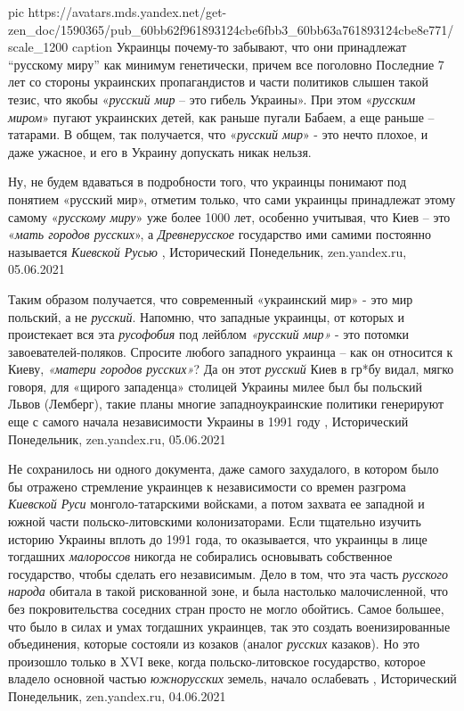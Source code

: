 \ifcmt
	pic https://avatars.mds.yandex.net/get-zen_doc/1590365/pub_60bb62f961893124cbe6fbb3_60bb63a761893124cbe8e771/scale_1200
  caption Украинцы почему-то забывают, что они принадлежат \enquote{русскому миру} как минимум генетически, причем все поголовно
\fi
Последние 7 лет со стороны украинских пропагандистов и части политиков слышен
такой тезис, что якобы «\emph{русский мир} – это гибель Украины». При этом
«\emph{русским миром}» пугают украинских детей, как раньше пугали Бабаем, а еще раньше
– татарами. В общем, так получается, что «\emph{русский мир}» - это нечто
плохое, и даже ужасное, и его в Украину допускать никак нельзя.

Ну, не будем вдаваться в подробности того, что украинцы понимают под понятием
«русский мир», отметим только, что сами украинцы принадлежат этому самому
«\emph{русскому миру}» уже более 1000 лет, особенно учитывая, что Киев – это
«\emph{мать городов русских}», а \emph{Древнерусское} государство ими самими
постоянно называется \emph{Киевской Русью}
, 
Исторический Понедельник, zen.yandex.ru, 05.06.2021 

Таким образом получается, что современный «украинский мир» - это мир польский,
а не \emph{русский}. Напомню, что западные украинцы, от которых и проистекает
вся эта \emph{русофобия} под лейблом \emph{«русский мир»} - это потомки
завоевателей-поляков. Спросите любого западного украинца – как он относится к
Киеву, \emph{«матери городов русских»}? Да он этот \emph{русский} Киев в гр*бу
видал, мягко говоря, для «щирого западенца» столицей Украины милее был бы
польский Львов (Лемберг), такие планы многие западноукраинские политики
генерируют еще с самого начала независимости Украины в 1991 году
, 
Исторический Понедельник, zen.yandex.ru, 05.06.2021 

Не сохранилось ни одного документа, даже самого захудалого, в котором было бы
отражено стремление украинцев к независимости со времен разгрома \emph{Киевской Руси}
монголо-татарскими войсками, а потом захвата ее западной и южной части
польско-литовскими колонизаторами. Если тщательно изучить историю Украины
вплоть до 1991 года, то оказывается, что украинцы в лице тогдашних \emph{малороссов}
никогда не собирались основывать собственное государство, чтобы сделать его
независимым.  Дело в том, что эта часть \emph{русского народа} обитала в такой
рискованной зоне, и была настолько малочисленной, что без покровительства
соседних стран просто не могло обойтись. Самое большее, что было в силах и умах
тогдашних украинцев, так это создать военизированные объединения, которые
состояли из козаков (аналог \emph{русских} казаков). Но это произошло только в XVI
веке, когда польско-литовское государство, которое владело основной частью
\emph{южнорусских} земель, начало ослабевать
, 
Исторический Понедельник, zen.yandex.ru, 04.06.2021

